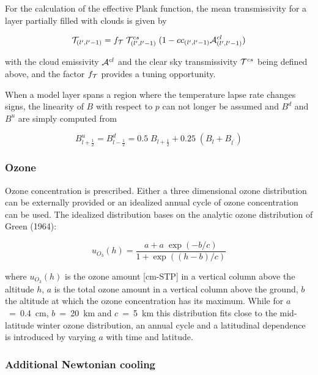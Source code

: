 For the calculation of the effective Plank function, the mean transmissivity for a layer partially
filled with clouds is given by

\begin{equation}
{\cal T}_{(l^{\prime},l^{\prime}-1)} = f_{{\cal T}} \; {\cal
T}^{cs}_{(l^{\prime},l^{\prime}-1)} \; (1 - 
cc_{(l^{\prime},l^{\prime}-1)}{\cal A}^{cl}_{(l^{\prime},l^{\prime}-1)})
\end{equation}


with the cloud emissivity ${\cal A}^{cl}$ and the clear sky transmissivity ${\cal T}^{cs}$
being defined above, and the factor $f_{{\cal T}}$  provides a tuning opportunity.

When a model layer spans a region where the temperature lapse rate changes signs, the linearity
of $B$ with respect to $p$ can not longer be assumed and $B^d$ and $B^u$ are simply
computed from

\begin{equation}
B^u_{l+\frac{1}{2}}=B^d_{l-\frac{1}{2}}= 0.5 \;  B_{l+\frac{1}{2}} + 0.25 \; (B_{l} +
B_{l^{\prime}})
\end{equation}


\subsubsection{Ozone}

Ozone concentration is prescribed. Either a three dimensional ozone distribution can be
externally provided or an idealized annual cycle of ozone concentration can be used. The
idealized distribution bases on the analytic ozone distribution of Green (1964):

\begin{equation}
u_{O_3}(h)=\frac{a+a \; \exp{(-b/c)}}{1+\exp((h-b)/c)}
\end{equation}

where $u_{O_3}(h)$ is the ozone amount [cm-STP] in a vertical column above the altitude $h$,
$a$ is the total ozone amount in a vertical column above the ground, $b$ the altitude at which
the ozone concentration has its maximum. While for $a$~=~0.4~cm, $b$~=~20~km and
$c$~=~5~km
this distribution fits close to the mid-latitude winter ozone distribution, an annual cycle and a
latitudinal dependence is introduced by varying $a$ with time and latitude.

\subsubsection{Additional Newtonian cooling}   

